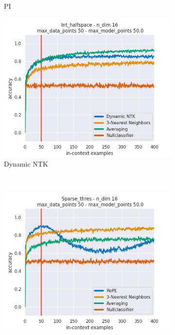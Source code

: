 \documentclass[letterpaper]{article} %
\begin{document}
\begin{figure}[tp]
\begin{subfigure}[t]{0.32\linewidth}
        \caption{PI}
    \end{subfigure}
    \begin{subfigure}[t]{0.32\linewidth}
        \includegraphics[width=\linewidth]{AnonymousSubmission/LaTeX/imgs/appendix/halfspace/ntk.png}
        \caption{Dynamic NTK}
    \end{subfigure}
    \\
    \begin{subfigure}[t]{0.32\linewidth}
        \includegraphics[width=\linewidth]{AnonymousSubmission/LaTeX/imgs/appendix/threshold/rope.png}

\end{subfigure}
\end{figure}
\end{document}
